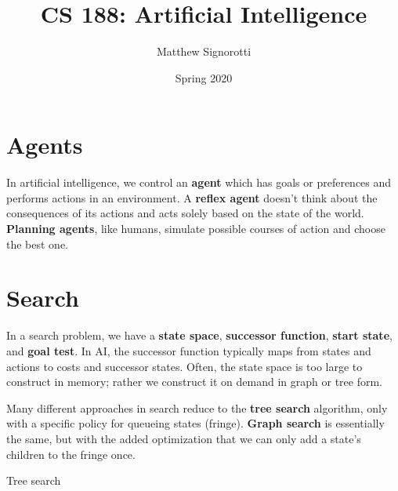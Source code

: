 \documentclass[12pt]{article}
\title{CS 188: Artificial Intelligence}
\author{Matthew Signorotti}
\date{Spring 2020}
\begin{document}
\maketitle

\tableofcontents

\section{Agents}

In artificial intelligence, we control an \textbf{agent} which has goals or preferences and performs actions in an environment. A \textbf{reflex agent} doesn't think about the consequences of its actions and acts solely based on the state of the world. \textbf{Planning agents}, like humans, simulate possible courses of action and choose the best one.

\section{Search}

In a search problem, we have a \textbf{state space}, \textbf{successor function}, \textbf{start state}, and \textbf{goal test}. In AI, the successor function typically maps from states and actions to costs and successor states. Often, the state space is too large to construct in memory; rather we construct it on demand in graph or tree form.

Many different approaches in search reduce to the \textbf{tree search} algorithm, only with a specific policy for queueing states (fringe). \textbf{Graph search} is essentially the same, but with the added optimization that we can only add a state's children to the fringe once.
\begin{algorithm}[h]
\caption{Tree search}


\end{algorithm}
\end{document}
